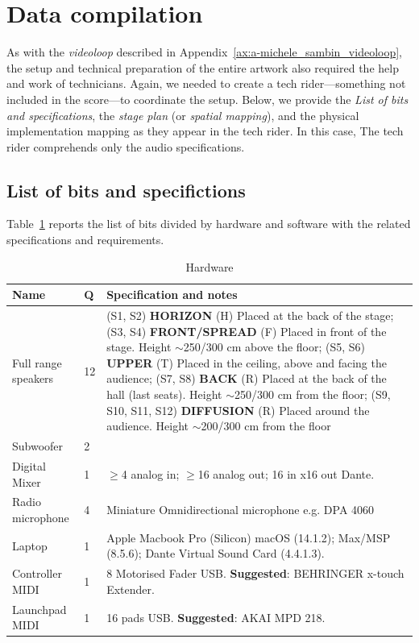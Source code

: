 \section{Data compilation}
As with the \textit{videoloop} described in Appendix~\ref{ax:a-michele_sambin_videoloop}, the setup and technical preparation of the entire artwork also required the help and work of technicians. Again, we needed to create a tech rider—something not included in the score—to coordinate the setup. Below, we provide the \textit{List of bits and specifications}, the \textit{stage plan} (or \textit{spatial mapping}), and the physical implementation mapping as they appear in the tech rider. In this case, The tech rider comprehends only the audio specifications.

\subsection*{List of bits and specifictions}
Table~\ref{tab:c-data-bits} reports the list of bits divided by hardware and software with the related specifications and requirements.
\begin{longtable}{|p{}|p{}|p{}|}
    \caption{Hardware} \label{tab:c-data-bits} \\
    \hline
    \textbf{Name} & \textbf{Q} & \textbf{Specification and notes} \\
    \hline
    Full range speakers & 12 & \scriptsize (S1, S2) \textbf{HORIZON} (H) Placed at the back of the stage; (S3, S4) \textbf{FRONT/SPREAD} (F) Placed in front of the stage. Height $\sim$250/300 cm above the floor; (S5, S6) \textbf{UPPER} (T) Placed in the ceiling, above and facing the audience; (S7, S8) \textbf{BACK} (R) Placed at the back of the hall (last seats). Height $\sim$250/300 cm from the floor; (S9, S10, S11, S12) \textbf{DIFFUSION} (R) Placed around the audience. Height $\sim$200/300 cm from the floor\\\hline
    Subwoofer & 2 & \\\hline
    Digital Mixer & 1 & \scriptsize $\geq$4 analog in; $\geq$16 analog out; 16 in x16 out Dante.\\\hline
    Radio microphone & 4 & \scriptsize Miniature Omnidirectional microphone e.g. DPA 4060 \\\hline
    Laptop & 1 & \scriptsize Apple Macbook Pro (Silicon) macOS (14.1.2); Max/MSP (8.5.6); Dante Virtual Sound Card (4.4.1.3).\\\hline
    Controller MIDI & 1 & \scriptsize 8 Motorised Fader USB. \textbf{Suggested}: BEHRINGER x-touch Extender.\\\hline 
    Launchpad MIDI & 1 & \scriptsize 16 pads USB. \textbf{Suggested}: AKAI MPD 218. \\\hline 
\end{longtable}

